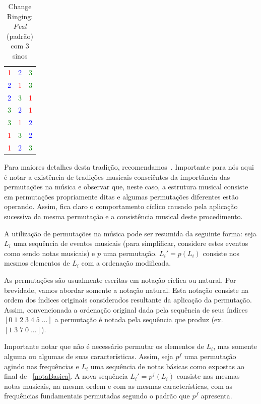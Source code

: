 \begin{table}[htpq!]
\centering
\begin{tabular}{l c r}
\textcolor{red}{1} & \textcolor{blue}{2} & \textcolor{green}{3} \\
\textcolor{blue}{2} & \textcolor{red}{1} & \textcolor{green}{3} \\
\textcolor{blue}{2} & \textcolor{green}{3} & \textcolor{red}{1} \\
\textcolor{green}{3} & \textcolor{blue}{2} & \textcolor{red}{1} \\
\textcolor{green}{3} & \textcolor{red}{1} & \textcolor{blue}{2} \\
\textcolor{red}{1} & \textcolor{green}{3} & \textcolor{blue}{2} \\
\textcolor{red}{1} & \textcolor{blue}{2} & \textcolor{green}{3}
\end{tabular}
\caption{Change Ringing: \emph{Peal} (padrão) com 3 sinos}
\label{tab:change}
\end{table}

Para maiores detalhes desta tradição, recomendamos~\cite{change}. Importante para nós aqui é notar a existência de tradições musicais consciêntes da importância das permutações na música e observar que, neste caso, a estrutura musical consiste em permutações propriamente ditas e algumas permutações diferentes estão operando. 
Assim, fica claro o comportamento cíclico causado pela aplicação sucessiva da mesma permutação
e a consistência musical deste procedimento.

A utilização de permutações na música pode ser resumida da seguinte forma:
seja $L_i$ uma sequência de eventos musicais (para simplificar, considere
estes eventos como sendo notas musicais) e $p$ uma permutação.
$L_i'=p(L_i)$ consiste nos mesmos elementos de $L_i$ com a ordenação
modificada.

As permutações são usualmente escritas em notação cíclica ou natural. Por brevidade, vamos abordar somente a notação natural. Esta notação consiste na ordem dos índices originais considerados resultante da aplicação da permutação. Assim,
convencionada a ordenação original dada pela sequência de seus índices $[0\;1\;2\;3\;4\;5\;...]$ a permutação é notada pela sequência que produz (ex. $[1\;3\;7\;0\;...]$).

Importante notar que não é necessário permutar os elementos de $L_i$, mas somente
alguma ou algumas de suas características. Assim, seja $p^f$ uma permutação agindo
nas frequências e $L_i$ uma sequência de notas básicas como expostas
ao final de ~\ref{notaBasica}. A nova sequência $L_i'=p^f(L_i)$ consiste nas mesmas
notas musicais, na mesma ordem e com as mesmas características, com as frequências fundamentais permutadas segundo
o padrão que $p^f$ apresenta.

